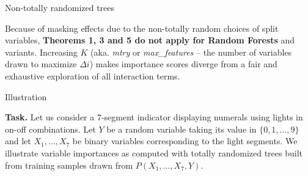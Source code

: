 \documentclass[final]{beamer}
\newcommand{\xmark}{\ding{55}}%
\begin{document}
\begin{frame}{}
\begin{textblock}{0.32}
\begin{block}{Non-totally randomized trees \phantom{p}}

{\color{red} \xmark} Because of masking effects due to the non-totally random
choices of split variables, \textbf{Theorems 1, 3 and 5 do not apply for Random Forests}
and variants. Increasing $K$ (aka. \textit{mtry} or \textit{max\_features} -- the number of variables drawn
to maximize $\Delta i$) makes importance scores diverge from a fair and
exhaustive exploration of all interaction terms.

\end{block}

\begin{block}{Illustration \phantom{p}}

\begin{minipage}{\linewidth}
    \begin{figure}
      \begin{center}
        \vspace{-0.5cm}
      \end{center}
    \end{figure}
    \textbf{Task.} Let us consider a 7-segment indicator displaying numerals
    using lights in on-off combinations. Let $Y$ be a random variable taking its value in $\{0, 1, ..., 9\}$
    and let $X_1, ..., X_7$ be binary variables corresponding to the light segments. We illustrate
    variable importances as computed with totally randomized trees built
    from training samples drawn from $P(X_1, ..., X_7, Y)$.
\end{minipage}


\end{block}
\end{textblock}
\end{frame}
\end{document}
